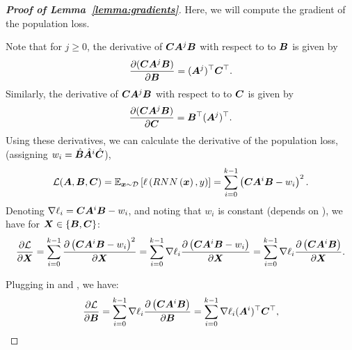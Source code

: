 \begin{proof}[\textbf{Proof of Lemma~\ref{lemma:gradients}}]
Here, we will compute the gradient of the population loss.

Note that for $j\ge 0$, the derivative of ${\bm{C}}{\bm{A}}^j{\bm{B}}$ with respect to to ${\bm{B}}$ is given by
\begin{equation}\label{eq:apdx:dB}
    \frac{\partial ({\bm{C}}{\bm{A}}^j{\bm{B}})}{\partial {\bm{B}}}=({\bm{A}}^j)^\top{\bm{C}}^\top.
\end{equation}
%
Similarly, the derivative of ${\bm{C}}{\bm{A}}^j{\bm{B}}$ with respect to to ${\bm{C}}$ is given by
\begin{equation}\label{eq:apdx:dC}
    \frac{\partial ({\bm{C}}{\bm{A}}^j{\bm{B}})}{\partial {\bm{C}}}={\bm{B}}^\top({\bm{A}}^j)^\top.
\end{equation}
%
%
Using these derivatives, we can calculate the derivative of the population loss, (assigning $w_i=\hat{{\bm{B}}}\hat{{\bm{A}}}^i\hat{{\bm{C}}}$),
\begin{equation}
    \mathcal{L}({\bm{A}},{\bm{B}},{\bm{C}}) = \mathbb{E}_{{\bm{x}}\sim\mathcal{D}}\left[ \ell\left( RNN\left({\bm{x}}\right), y\right)\right]=  \sum_{i=0}^{k-1} \left( {\bm{C}}{\bm{A}}^i{\bm{B}} - w_i \right)^2.
\end{equation}
%
Denoting $\nabla \ell_i = {\bm{C}}{\bm{A}}^i{\bm{B}}-w_i$, and noting that $w_i$ is constant (depends on \smash{$\hat{\Theta}$}), we have for ${\bm{X}} \in \{{\bm{B}}, {\bm{C}}\}$:
\begin{equation}
    \frac{\partial \mathcal{L}}{\partial {\bm{X}}} =  \sum_{i=0}^{k-1} \frac{\partial\left( {\bm{C}}{\bm{A}}^i{\bm{B}} - w_i \right)^2}{\partial {\bm{X}}} = \sum_{i=0}^{k-1} \nabla \ell_i \frac{\partial\left( {\bm{C}}{\bm{A}}^i{\bm{B}} - w_i \right)}{\partial {\bm{X}}} = \sum_{i=0}^{k-1} \nabla \ell_i \frac{\partial\left( {\bm{C}}{\bm{A}}^i{\bm{B}} \right)}{\partial {\bm{X}}}.
\end{equation}

Plugging in  and , we have:
\begin{equation}
    \frac{\partial \mathcal{L}}{\partial {\bm{B}}} = \sum_{i=0}^{k-1} \nabla \ell_i \frac{\partial\left( {\bm{C}}{\bm{A}}^i{\bm{B}} \right)}{\partial {\bm{B}}} = \sum_{i=0}^{k-1} \nabla \ell_i ({\bm{A}}^i)^\top {\bm{C}}^\top,
\end{equation}


\end{proof}

